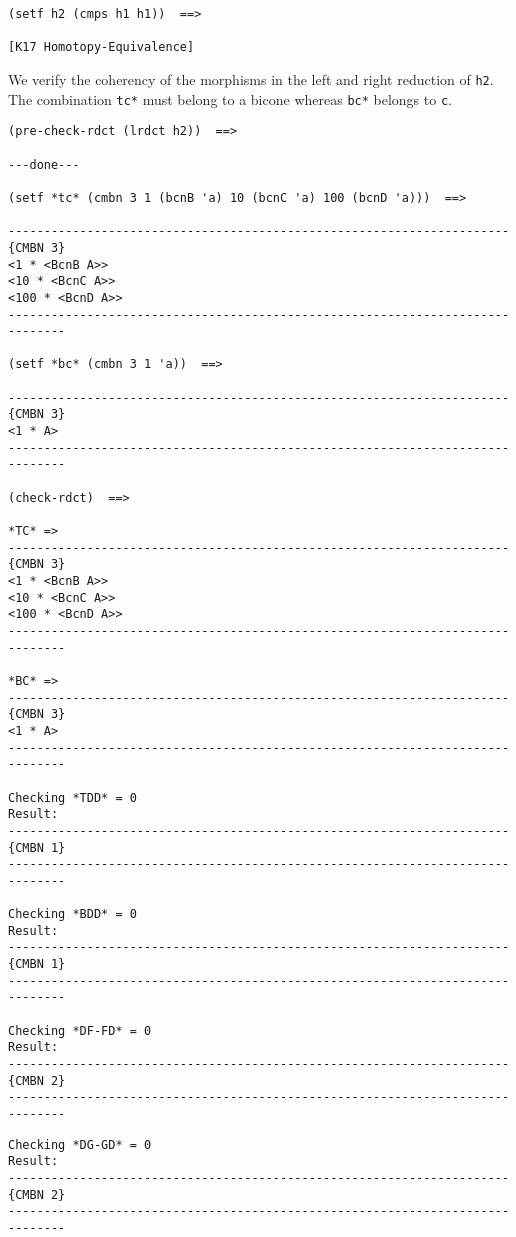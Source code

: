 {{\begin{verbatim}
(setf h2 (cmps h1 h1))  ==>

[K17 Homotopy-Equivalence]
\end{verbatim}}
We verify the coherency of the morphisms in the left and right reduction
of {\tt h2}. The combination {\tt *tc*} must belong to a bicone whereas
{\tt *bc*} belongs to {\tt c}.
{\footnotesize \begin{verbatim}
(pre-check-rdct (lrdct h2))  ==>

---done---

(setf *tc* (cmbn 3 1 (bcnB 'a) 10 (bcnC 'a) 100 (bcnD 'a)))  ==>

----------------------------------------------------------------------{CMBN 3}
<1 * <BcnB A>>
<10 * <BcnC A>>
<100 * <BcnD A>>
------------------------------------------------------------------------------

(setf *bc* (cmbn 3 1 'a))  ==>

----------------------------------------------------------------------{CMBN 3}
<1 * A>
------------------------------------------------------------------------------

(check-rdct)  ==>

*TC* => 
----------------------------------------------------------------------{CMBN 3}
<1 * <BcnB A>>
<10 * <BcnC A>>
<100 * <BcnD A>>
------------------------------------------------------------------------------

*BC* => 
----------------------------------------------------------------------{CMBN 3}
<1 * A>
------------------------------------------------------------------------------

Checking *TDD* = 0
Result: 
----------------------------------------------------------------------{CMBN 1}
------------------------------------------------------------------------------

Checking *BDD* = 0
Result: 
----------------------------------------------------------------------{CMBN 1}
------------------------------------------------------------------------------

Checking *DF-FD* = 0
Result: 
----------------------------------------------------------------------{CMBN 2}
------------------------------------------------------------------------------
\end{verbatim}}
\newpage
{\footnotesize \begin{verbatim}
Checking *DG-GD* = 0
Result: 
----------------------------------------------------------------------{CMBN 2}
------------------------------------------------------------------------------


\end{verbatim}}}
